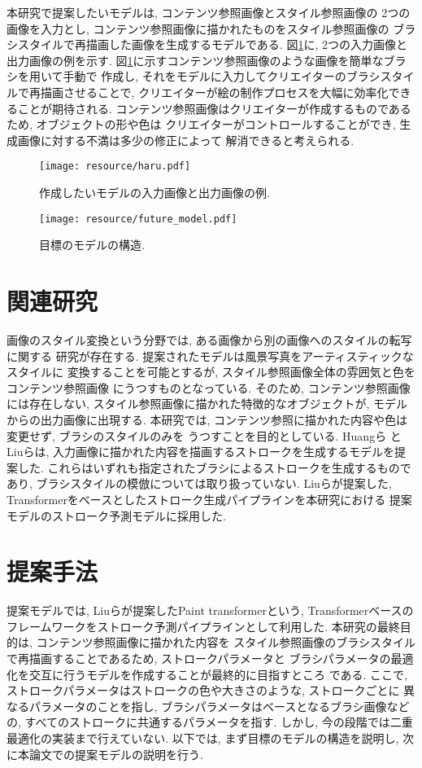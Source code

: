 \documentclass[MIRU,submit,uplatex]{miru2023j}
\begin{document}
本研究で提案したいモデルは, コンテンツ参照画像とスタイル参照画像の
2つの画像を入力とし, コンテンツ参照画像に描かれたものをスタイル参照画像の
ブラシスタイルで再描画した画像を生成するモデルである. 
図\ref{fig:haru}に, 2つの入力画像と出力画像の例を示す.
図\ref{fig:haru}に示すコンテンツ参照画像のような画像を簡単なブラシを用いて手動で
作成し, それをモデルに入力してクリエイターのブラシスタイルで再描画させることで,
クリエイターが絵の制作プロセスを大幅に効率化できることが期待される.
コンテンツ参照画像はクリエイターが作成するものであるため, オブジェクトの形や色は
クリエイターがコントロールすることができ, 生成画像に対する不満は多少の修正によって
解消できると考えられる. 
\begin{figure}
    \centering
    \texttt{[image: resource/haru.pdf]}
    \caption{作成したいモデルの入力画像と出力画像の例.}
    \label{fig:haru}
\end{figure}

\begin{figure*}[t]
    \centering
    \texttt{[image: resource/future\_model.pdf]}
    \caption{目標のモデルの構造.}
    \label{fig:final_model}
\end{figure*}

\section{関連研究}
画像のスタイル変換という分野では, ある画像から別の画像へのスタイルの転写に関する
研究\cite{IST}が存在する. 提案されたモデルは風景写真をアーティスティックなスタイルに
変換することを可能とするが, スタイル参照画像全体の雰囲気と色をコンテンツ参照画像
にうつすものとなっている. そのため, コンテンツ参照画像には存在しない, 
スタイル参照画像に描かれた特徴的なオブジェクトが, モデルからの出力画像に出現する.
本研究では, コンテンツ参照に描かれた内容や色は変更せず, ブラシのスタイルのみを
うつすことを目的としている. 
Huangら\cite{Huang_2019_ICCV} と Liuら\cite{liu2021paint}は, 
入力画像に描かれた内容を描画するストロークを生成するモデルを提案した. 
これらはいずれも指定されたブラシによるストロークを生成するものであり, 
ブラシスタイルの模倣については取り扱っていない. 
Liuらが提案した, Transformerをベースとしたストローク生成パイプラインを本研究における
提案モデルのストローク予測モデルに採用した. 

\section{提案手法}
提案モデルでは, Liuらが提案したPaint transformer\cite{liu2021paint}という, 
Transformerベースのフレームワークをストローク予測パイプラインとして利用した.
本研究の最終目的は, コンテンツ参照画像に描かれた内容を
スタイル参照画像のブラシスタイルで再描画することであるため, ストロークパラメータと
ブラシパラメータの最適化を交互に行うモデルを作成することが最終的に目指すところ
である.
ここで, ストロークパラメータはストロークの色や大きさのような, ストロークごとに
異なるパラメータのことを指し, ブラシパラメータはベースとなるブラシ画像などの, 
すべてのストロークに共通するパラメータを指す. 
しかし, 今の段階では二重最適化の実装まで行えていない. 
以下では, まず目標のモデルの構造を説明し, 次に本論文での提案モデルの説明を行う.
\end{document}
